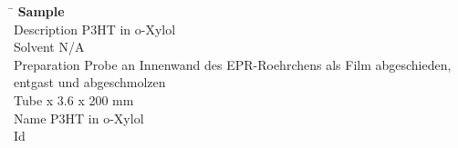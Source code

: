 \documentclass{article}
\begin{document}
\begin{minipage}{\textwidth}
\begin{tabbing}
\hspace{3.5cm} \= \kill
\textbf{Sample}\\
			Description \> P3HT in o-Xylol
		\\
				Solvent \> N/A
		\\
				Preparation \> Probe an Innenwand des EPR-Roehrchens als Film abgeschieden, entgast und abgeschmolzen
		\\
				Tube  x 3.6 x 200 mm
		\\
				Name \> P3HT in o-Xylol
		\\
				Id 
		\\
			\end{tabbing}
\end{minipage}
	
\end{document}

